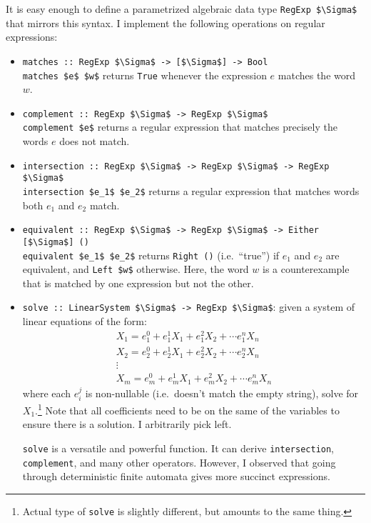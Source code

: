 \documentclass[11pt]{article}
\newcommand{\haskell}{\lstinline}
\begin{document}
It is easy enough to define a parametrized algebraic data type \haskell{RegExp $\Sigma$} that mirrors this syntax. I implement the following operations on regular expressions:
\begin{itemize}
  \item \haskell{matches :: RegExp $\Sigma$ -> [$\Sigma$] -> Bool}\\
    \haskell{matches $e$ $w$} returns \haskell{True} whenever the expression $e$ matches the word $w$.

  \item \haskell{complement :: RegExp $\Sigma$ -> RegExp $\Sigma$}\\
    \haskell{complement $e$} returns a regular expression that matches precisely the words $e$ does not match.

  \item \haskell{intersection :: RegExp $\Sigma$ -> RegExp $\Sigma$ -> RegExp $\Sigma$}\\
    \haskell{intersection $e_1$ $e_2$} returns a regular expression that matches words both $e_1$ and $e_2$ match.

  \item \haskell{equivalent :: RegExp $\Sigma$ -> RegExp $\Sigma$ -> Either [$\Sigma$] ()}\\
    \haskell{equivalent $e_1$ $e_2$} returns \haskell{Right ()} (i.e.\ ``true'') if $e_1$ and $e_2$ are equivalent, and \haskell{Left $w$} otherwise. Here, the word $w$ is a counterexample that is matched by one expression but not the other.

  \item \haskell{solve :: LinearSystem $\Sigma$ -> RegExp $\Sigma$}: given a system of linear equations of the form:
    \begin{gather*}
      X_1 = e_1^0 + e_1^1 X_1 + e_1^2 X_2 + \cdots e_1^n X_n\\
      X_2 = e_2^0 + e_2^1 X_1 + e_2^2 X_2 + \cdots e_2^n X_n\\
          \vdots\\
      X_m = e_m^0 + e_m^1 X_1 + e_m^2 X_2 + \cdots e_m^n X_n
    \end{gather*}
    where each $e_i^j$ is non-nullable (i.e.\ doesn't match the empty string), solve for $X_1$.\footnote{%
    Actual type of \haskell{solve} is slightly different, but amounts to the same thing.} Note that all coefficients need to be on the same of the variables to ensure there is a solution. I arbitrarily pick left.

    \haskell{solve} is a versatile and powerful function. It can derive \haskell{intersection}, \haskell{complement}, and many other operators. However, I observed that going through deterministic finite automata gives more succinct expressions.
\end{itemize}
\end{document}
